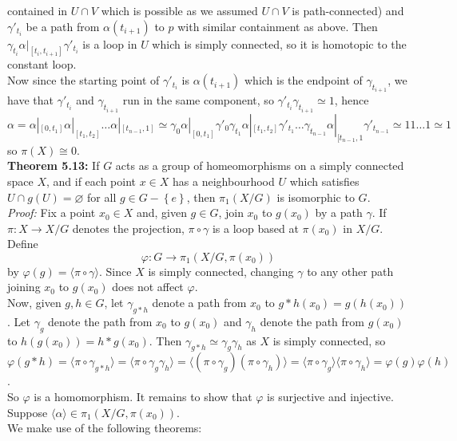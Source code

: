 \documentclass[a4paper]{article}
\begin{document}
      contained in $U \cap V$ which is possible as we assumed $U \cap V$ is
      path-connected) and
      $\gamma'_{t_i}$ be a path from
      $\alpha(t_{i+1})$ to $p$ with similar containment as above. Then
      $\gamma_{t_i} \alpha|_{[t_i, t_{i+1}]} \gamma'_{t_i}$ is a loop in
      $U$ which is simply connected, so it is homotopic to the constant
      loop.\\
      Now since the starting point of $\gamma'_{t_i}$ is
  $\alpha\left( t_{i+1} \right) $ which is the endpoint of
  $\gamma_{t_{i+1}}$, we have that $\gamma'_{t_i}$ and
  $\gamma_{t_{i+1}}$ run in the same component, so
  $\gamma'_{t_{i}} \gamma_{t_{i+1}} \simeq 1$, hence
  \[
      \alpha = \alpha|_{[0,t_1]} \alpha|_{[t_1, t_2]}\ldots
      \alpha|_{[t_{n-1},1]}
      \simeq \gamma_0 \alpha|_{[0,t_1]}
      \gamma'_{0} \gamma_{t_1} \alpha|_{[t_1, t_2]}
      \gamma'_{t_1}\ldots \gamma_{t_{n-1}} \alpha|_{[t_{n-1},1}
      \gamma'_{t_{n-1}}
      \simeq 1 1 \ldots 1 \simeq 1
  \] 
  so $\pi(X) \cong 0$.\\
  \linebreak
  \textbf{Theorem 5.13:} If $G$ acts as a group of homeomorphisms on a simply
  connected space $X$, and if each point $x \in X$ has a neighbourhood $U$ 
  which satisfies $U \cap g(U) = \varnothing$ for all $g \in G - \left\{
  e \right\} $, then $\pi_1 \left( X /G \right) $ is isomorphic to $G$.\\
  \linebreak
  \textit{Proof:} Fix a point $x_0 \in X$ and, given $g \in G$, join
  $x_0$ to $g(x_0)$ by a path $\gamma$. If $\pi  \colon X \to X /G$ denotes the
  projection, $\pi \circ \gamma$ is a loop based at $\pi (x_0)$ in
  $X /G$. Define
  \[
  \varphi  \colon G \to \pi_1 \left( X /G, \pi(x_0) \right) 
  \] 
  by $\varphi (g) = \langle \pi \circ \gamma \rangle $. Since $X$ is simply
  connected, changing $\gamma$ to any other path joining $x_0$ to $g(x_0)$ does
  not affect $\varphi$.\\
  \linebreak
 Now, given $g, h \in G$, let $\gamma_{g*h}$ denote a path
 from $x_0$ to $g* h(x_0) = g (h(x_0))$. Let
 $\gamma_g$ denote the path from $x_0$ to $g(x_0)$ and
 $\gamma_h$ denote the path from $g(x_0)$ to 
 $h(g(x_0)) = h*g (x_0)$. Then
 $\gamma_{g*h} \simeq \gamma_g \gamma_h$ as $X$ is simply connected, so
 $\varphi(g*h)  = \langle \pi \circ \gamma_{g*h} \rangle 
 = \langle \pi \circ \gamma_g \gamma_h \rangle 
 = \langle \left( \pi \circ \gamma_g \right) 
 \left( \pi \circ \gamma_h \right) \rangle 
 = \langle \pi \circ \gamma_g \rangle 
 \langle \pi \circ \gamma_h \rangle 
 = \varphi(g) \varphi(h)$.\\
 \linebreak
 So $\varphi$ is a homomorphism. It remains to show that
 $\varphi$ is surjective and injective.\\
 \linebreak
 Suppose $\langle \alpha \rangle \in \pi_1\left( X /G, \pi(x_0) \right) $.\\
 \linebreak
 We make use of the following theorems:
\end{document}

